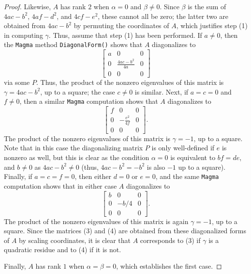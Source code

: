 \documentclass[10pt,a4paper]{amsart}
\numberwithin{equation}{section}
\numberwithin{figure}{section}
\theoremstyle{definition}
\theoremstyle{remark}
\theoremstyle{plain}
\theoremstyle{plain}
\theoremstyle{definition}
\theoremstyle{plain}
\theoremstyle{plain}
\begin{document}
\begin{proof}
Likewise, $A$ has rank $2$ when $\alpha=0$ and $\beta\ne 0$. Since $\beta$ is the sum of $4ac-b^2$, $4af-d^2$, and $4cf-e^2$, these cannot all be zero; the latter two are obtained from $4ac-b^2$ by permuting the coordinates of $A$, which justifies step (1) in computing $\gamma$. Thus, assume that step (1) has been performed. If $a\ne 0$, then the \texttt{Magma} method \texttt{DiagonalForm()} shows that $A$ diagonalizes to
\begin{equation*}
\begin{bmatrix}
a&0&0\\
0&\frac{4ac-b^2}{4a}&0\\
0&0&0
\end{bmatrix}
\end{equation*}
via some $P$. Thus, the product of the nonzero eigenvalues of this matrix is $\gamma=4ac-b^2$, up to a square; the case $c\ne 0$ is similar. Next, if $a=c=0$ and $f\ne 0$, then a similar \texttt{Magma} computation shows that $A$ diagonalizes to
\begin{equation*}
\begin{bmatrix}
f&0&0\\
0&-\frac{e^2}{4f}&0\\
0&0&0
\end{bmatrix}.
\end{equation*}
The product of the nonzero eigenvalues of this matrix is $\gamma=-1$, up to a square. Note that in this case the diagonalizing matrix $P$ is only well-defined if $e$ is nonzero as well, but this is clear as the condition $\alpha=0$ is equivalent to $bf=de$, and $b\ne 0$ as $4ac-b^2\ne 0$ (thus, $4ac-b^2=-b^2$ is also $-1$ up to a square). Finally, if $a=c=f=0$, then either $d=0$ or $e=0$, and the same \texttt{Magma} computation shows that in either case $A$ diagonalizes to 
\begin{equation*}
\begin{bmatrix}
b&0&0\\
0&-b/4&0\\
0&0&0
\end{bmatrix}.
\end{equation*}
The product of the nonzero eigenvalues of this matrix is again $\gamma=-1$, up to a square. Since the matrices (3) and (4) are obtained from these diagonalized forms of $A$ by scaling coordinates, it is clear that $A$ corresponds to (3) if $\gamma$ is a quadratic residue and to (4) if it is not.

Finally, $A$ has rank $1$ when $\alpha=\beta=0$, which establishes the first case.
\end{proof}
\end{document}
